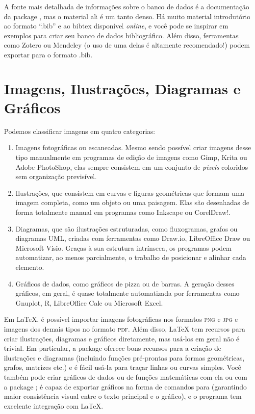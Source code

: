 A fonte mais detalhada de informações sobre o banco de dados é a
documentação da package , mas o material ali é um tanto denso.
Há muito material introdutório ao formato ``.bib'' e ao bibtex disponível
\emph{online}, e você pode se inspirar em exemplos para criar seu banco de
dados bibliográfico. Além disso, ferramentas como Zotero ou
Mendeley (o uso de uma delas é altamente recomendado!)
podem exportar para o formato .bib.

\section{Imagens, Ilustrações, Diagramas e Gráficos}

Podemos classificar imagens em quatro categorias:

\begin{enumerate}
    \item Imagens fotográficas ou escaneadas. Mesmo sendo possível criar
    imagens desse tipo manualmente em programas de edição de imagens como
    Gimp, Krita ou Adobe PhotoShop, elas sempre consistem em um conjunto
    de \emph{pixels} coloridos sem organização previsível.

    \item Ilustrações, que consistem em curvas e figuras geométricas
    que formam uma imagem completa, como um objeto ou uma paisagem.
    Elas são desenhadas de forma totalmente manual em programas como
    Inkscape ou CorelDraw!.

    \item Diagramas, que são ilustrações estruturadas, como fluxogramas,
    grafos ou diagramas UML, criadas com ferramentas como Draw.io,
    LibreOffice Draw ou Microsoft Visio. Graças à sua estrutura intrínseca,
    os programas podem automatizar, ao menos parcialmente, o trabalho de
    posicionar e alinhar cada elemento.

    \item Gráficos de dados, como gráficos de pizza ou de barras. A
    geração desses gráficos, em geral, é quase totalmente automatizada
    por ferramentas como Gnuplot, R, LibreOffice Calc ou Microsoft Excel.
\end{enumerate}

Em \LaTeX{}, é possível importar imagens fotográficas nos formatos
\textsc{png} e \textsc{jpg} e imagens dos demais tipos no formato
\textsc{pdf}. Além disso, \LaTeX{} tem recursos para criar ilustrações,
diagramas e gráficos diretamente, mas usá-los em geral não é trivial.
Em particular, a package  oferece bons recursos para a
criação de ilustrações e diagramas (incluindo funções pré-prontas
para formas geométricas, grafos, matrizes etc.) e é fácil usá-la
para traçar linhas ou curvas simples. Você também pode criar gráficos
de dados ou de funções matemáticas com ela ou com a package
;  é capaz de exportar gráficos na forma
de comandos para  (garantindo maior consistência visual entre
o texto principal e o gráfico), e o programa  tem
excelente integração com \LaTeX{}.

